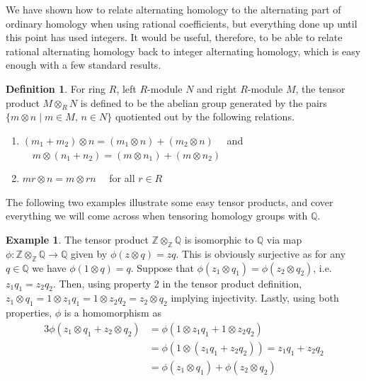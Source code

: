 \documentclass[11pt,a4paper,twoside]{article}
\theoremstyle{plain}
\theoremstyle{definition}
\newtheorem{defn}[thm]{Definition}
\theoremstyle{definition}
\theoremstyle{definition}
\theoremstyle{definition}
\newtheorem{example}[thm]{Example}
\theoremstyle{definition}
\begin{document}
We have shown how to relate alternating homology to the alternating part of ordinary homology when using rational coefficients, but everything done up until this point has used integers. It would be useful, therefore, to be able to relate rational alternating homology back to integer alternating homology, which is easy enough with a few standard results.

\vspace{2mm}
\begin{defn}
For ring $R$, left $R$-module $N$ and right $R$-module $M$, the tensor product $M\otimes_{R}N$ is defined to be the abelian group generated by the pairs $\{m\otimes n\mid m\in M,\,n\in N\}$ quotiented out by the following relations.
\begin{enumerate}
\item $(m_1+m_2)\otimes n=(m_1\otimes n) + (m_2\otimes n)\quad$ and $\quad m\otimes(n_1+n_2)=(m\otimes n_1) + (m\otimes n_2)$
\item $mr\otimes n=m\otimes rn\quad$ for all $r\in R $
\end{enumerate}
\end{defn}

The following two examples illustrate some easy tensor products, and cover everything we will come across when tensoring homology groups with $\mathbb{Q}$.
\begin{example}\label{Ex:ZtensorQ}
The tensor product $\mathbb{Z}\otimes_\mathbb{Z}\mathbb{Q}$ is isomorphic to $\mathbb{Q}$ via map $\phi\!:\!\mathbb{Z}\otimes_\mathbb{Z}\mathbb{Q}\longrightarrow \mathbb{Q}$ given by $\phi(z\otimes q)=zq$. This is obviously surjective as for any $q\in\mathbb{Q}$ we have $\phi(1\otimes q)=q$. Suppose that $\phi(z_1\otimes q_1)=\phi(z_2\otimes q_2)$, i.e. $z_1q_1=z_2q_2$. Then, using property 2 in the tensor product definition, $z_1\otimes q_1=1\otimes z_1q_1=1\otimes z_2q_2=z_2\otimes q_2$ implying injectivity. Lastly, using both properties, $\phi$ is a homomorphism as
\begin{alignat*}{3}
    \phi(z_1\otimes q_1 + z_2\otimes q_2) & =\phi(1\otimes z_1q_1+1\otimes z_2q_2)\\
    &=\phi(1\otimes(z_1q_1+z_2q_2))=z_1q_1+z_2q_2\\
    &=\phi(z_1\otimes q_1)+\phi(z_2\otimes q_2)
\end{alignat*}
\end{example}
\end{document}
